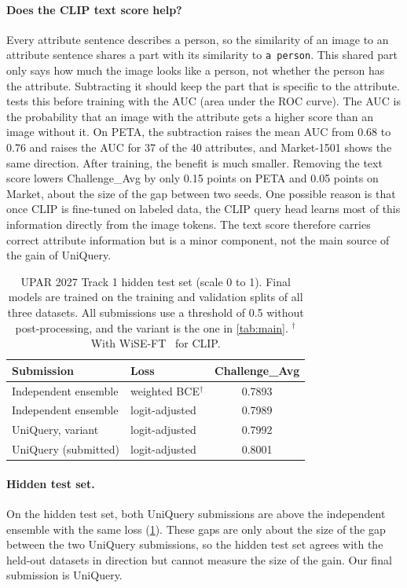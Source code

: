 \documentclass[10pt,twocolumn,letterpaper]{article}
\begin{document}
\paragraph{Does the CLIP text score help?} Every attribute sentence describes a person, so the similarity of an image to an attribute sentence shares a part with its similarity to \texttt{a person}. This shared part only says how much the image looks like a person, not whether the person has the attribute. Subtracting it should keep the part that is specific to the attribute.  tests this before training with the AUC (area under the ROC curve). The AUC is the probability that an image with the attribute gets a higher score than an image without it. On PETA, the subtraction raises the mean AUC from 0.68 to 0.76 and raises the AUC for 37 of the 40 attributes, and Market-1501 shows the same direction. After training, the benefit is much smaller. Removing the text score lowers Challenge\_Avg by only 0.15 points on PETA and 0.05 points on Market, about the size of the gap between two seeds. One possible reason is that once CLIP is fine-tuned on labeled data, the CLIP query head learns most of this information directly from the image tokens. The text score therefore carries correct attribute information but is a minor component, not the main source of the gain of UniQuery.

\begin{table}[t]
\centering
\small
\setlength{\tabcolsep}{3.5pt}
\begin{tabular}{@{}llc@{}}
\toprule
Submission & Loss & Challenge\_Avg \\
\midrule
Independent ensemble & weighted BCE$^\dagger$ & 0.7893 \\
Independent ensemble & logit-adjusted & 0.7989 \\
UniQuery, variant & logit-adjusted & 0.7992 \\
UniQuery (submitted) & logit-adjusted & 0.8001 \\
\bottomrule
\end{tabular}
\caption{UPAR 2027 Track 1 hidden test set (scale 0 to 1). Final models are trained on the training and validation splits of all three datasets. All submissions use a threshold of 0.5 without post-processing, and the variant is the one in \cref{tab:main}. $^\dagger$With WiSE-FT~\cite{wiseft} for CLIP.}
\label{tab:test}
\end{table}

\paragraph{Hidden test set.} On the hidden test set, both UniQuery submissions are above the independent ensemble with the same loss (\cref{tab:test}). These gaps are only about the size of the gap between the two UniQuery submissions, so the hidden test set agrees with the held-out datasets in direction but cannot measure the size of the gain. Our final submission is UniQuery.
\end{document}
